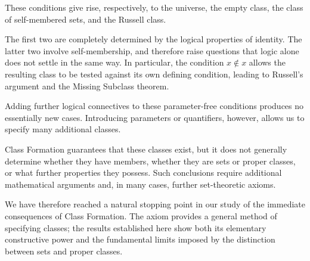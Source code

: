 These conditions give rise, respectively, to the universe, the empty class, the class of self-membered sets, and the Russell class.

The first two are completely determined by the logical properties of identity. The latter two involve self-membership, and therefore raise questions that logic alone does not settle in the same way. In particular, the condition \(x\notin x\) allows the resulting class to be tested against its own defining condition, leading to Russell's argument and the Missing Subclass theorem.

Adding further logical connectives to these parameter-free conditions produces no essentially new cases. Introducing parameters or quantifiers, however, allows us to specify many additional classes.

Class Formation guarantees that these classes exist, but it does not generally determine whether they have members, whether they are sets or proper classes, or what further properties they possess. Such conclusions require additional mathematical arguments and, in many cases, further set-theoretic axioms.

We have therefore reached a natural stopping point in our study of the immediate consequences of Class Formation. The axiom provides a general method of specifying classes; the results established here show both its elementary constructive power and the fundamental limits imposed by the distinction between sets and proper classes.
